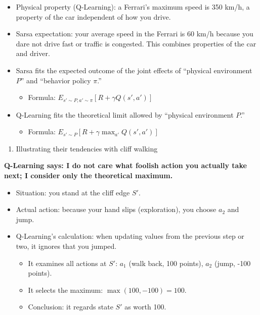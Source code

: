\begin{itemize}
\item
  Physical property (Q-Learning): a Ferrari's maximum speed is 350 km/h, a property of the car independent of how you drive.
\item
  Sarsa expectation: your average speed in the Ferrari is 60 km/h because you dare not drive fast or traffic is congested. This combines properties of the car and driver.
\item
  Sarsa fits the expected outcome of the joint effects of ``physical environment \(P\)'' and ``behavior policy \(\pi\).''

  \begin{itemize}
  \tightlist
  \item
    Formula: \(E_{s'\sim P,a'\sim\pi}[R+\gamma Q(s',a')]\)
  \end{itemize}
\item
  Q-Learning fits the theoretical limit allowed by ``physical environment \(P\).''

  \begin{itemize}
  \tightlist
  \item
    Formula: \(E_{s'\sim P}[R+\gamma\max_{a'}Q(s',a')]\)
  \end{itemize}
\end{itemize}

\begin{enumerate}
\def\labelenumi{\arabic{enumi}.}
\setcounter{enumi}{2}
\tightlist
\item
  Illustrating their tendencies with cliff walking
\end{enumerate}

\textbf{Q-Learning says: I do not care what foolish action you actually take next; I consider only the theoretical maximum.}

\begin{itemize}
\tightlist
\item
  Situation: you stand at the cliff edge \(S'\).
\item
  Actual action: because your hand slips (exploration), you choose \(a_2\) and jump.
\item
  Q-Learning's calculation: when updating values from the previous step or two, it ignores that you jumped.

  \begin{itemize}
  \tightlist
  \item
    It examines all actions at \(S'\): \(a_1\) (walk back, 100 points), \(a_2\) (jump, -100 points).
  \item
    It selects the maximum: \(\max(100,-100)=100\).
  \item
    Conclusion: it regards state \(S'\) as worth 100.
  \end{itemize}
\end{itemize}

